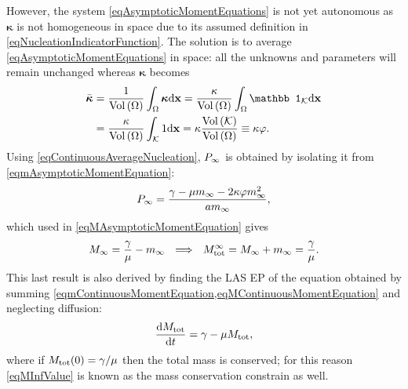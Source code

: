\documentclass{article}
\begin{document}

                However, the system \eqref{eqAsymptoticMomentEquations} is not yet autonomous as $\boldsymbol\kappa$ is not homogeneous in space due to its assumed definition in \eqref{eqNucleationIndicatorFunction}. The solution is to average \eqref{eqAsymptoticMomentEquations} in space: all the unknowns and parameters will remain unchanged whereas $\boldsymbol\kappa$ becomes
                \begin{equation}
                    \begin{aligned}
                        \bar{\boldsymbol\kappa}&=
                        \frac1{\Vol{\Omega}}\int_\Omega\boldsymbol\kappa\de\mathbf x=
                        \frac\kappa{\Vol{\Omega}}\int_\Omega\mathbb1_{\mathcal K}\de\mathbf x\\
                        &=\frac\kappa{\Vol{\Omega}}\int_{\mathcal K}1\de\mathbf x=
                        \kappa\frac{\Vol{\mathcal K}}{\Vol{\Omega}}\equiv\kappa\varphi.
                    \end{aligned}
                    \label{eqContinuousAverageNucleation}
                \end{equation}
                Using \eqref{eqContinuousAverageNucleation}, $P_\infty$ is obtained by isolating it from \eqref{eqmAsymptoticMomentEquation}:
                \begin{equation}
                    P_\infty=\frac{\gamma-\mu m_\infty-2\kappa\varphi m_\infty^2}{am_\infty},
                    \label{eqPInfValue}
                \end{equation}
                which used in \eqref{eqMAsymptoticMomentEquation} gives
                \begin{equation}
                    \MInf=\frac\gamma\mu-\mInf\ \ \implies\ \
                    \TotM^\infty=\MInf+\mInf=\frac\gamma\mu.
                    \label{eqMInfValue}
                \end{equation}
                This last result is also derived by finding the LAS EP of the equation obtained by summing \cref{eqmContinuousMomentEquation,eqMContinuousMomentEquation} and neglecting diffusion:
                \begin{equation}
                    \frac{\mathrm{d}M_{\text{tot}}}{\mathrm{d}t}=\gamma-\mu M_{\text{tot}},
                    \label{eqMassConservation}
                \end{equation}
                where if $M_{\text{tot}}(0)=\gamma/\mu$ then the total mass is conserved; for this reason \eqref{eqMInfValue} is known as the mass conservation constrain as well.
\end{document}
